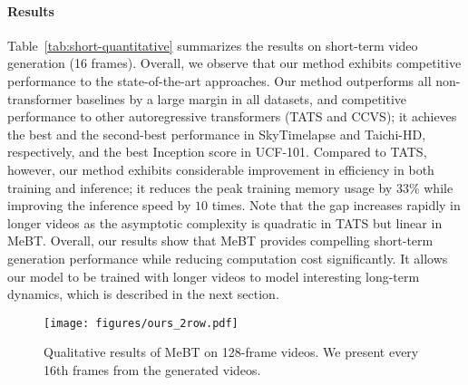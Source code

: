 \documentclass[10pt,twocolumn,letterpaper]{article}
\newcommand{\cutparagraphup}{\vspace*{-0.1in}}
\begin{document}
\cutparagraphup
\paragraph{Results}
Table~\ref{tab:short-quantitative} summarizes the results on short-term video generation (16 frames).
Overall, we observe that our method exhibits competitive performance to the state-of-the-art approaches.
Our method outperforms all non-transformer baselines by a large margin in all datasets, and competitive performance to other autoregressive transformers (TATS and CCVS); it achieves the best and the second-best performance in SkyTimelapse and Taichi-HD, respectively, and the best Inception score in UCF-101.
Compared to TATS, however, our method exhibits considerable improvement in efficiency in both training and inference; it reduces the peak training memory usage by $33\%$ while improving the inference speed by $10$ times.
Note that the gap increases rapidly in longer videos as the asymptotic complexity is quadratic in TATS but linear in MeBT.
Overall, our results show that MeBT provides compelling short-term generation performance while reducing computation cost significantly. 
It allows our model to be trained with longer videos to model interesting long-term dynamics, which is described in the next section.


\iffalse
Our model shows comparable performance with state-of-the-art models. Specifically, our model showed preferable performance on SkyTimelapse dataset which mainly contains global motions. We conjecture that our model has strength in modeling global actions as it can access long-range contexts bidirectionally.

In addition, compared to the autoregressive transformer, our model exhibits improved efficiency in both training and inference. Compared to TATS-base, our model could reduce the training peak memory into $35\%$. Since our model has the same number of attention layers as the TATS-base, we may conclude that MeBT's efficiency directly comes from the latent bottleneck. Moreover, our model showed about 8 times faster inference speed by reducing the number of decoding steps compared to the autoregressive transformer.
\fi


\begin{figure}[ht]
    \centering
\texttt{[image: figures/ours\_2row.pdf]}
\vspace{-0.17cm}
    \caption{
Qualitative results of MeBT on 128-frame videos. We present every 16th frames from the generated videos.
    }
\label{fig:longterm_ours}
    \vspace{-0.7cm}
\end{figure}
\end{document}
